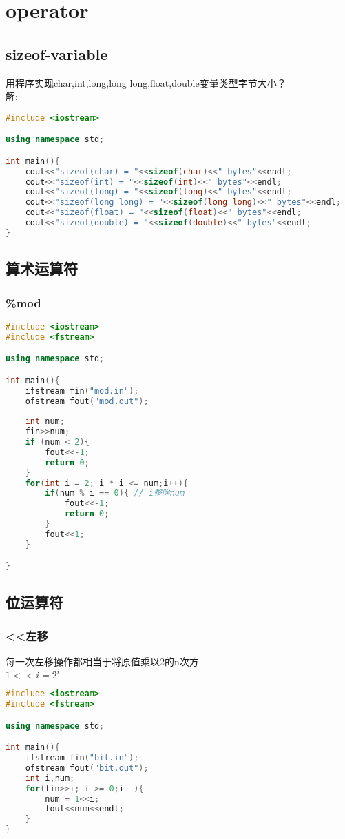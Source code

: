 \documentclass[12pt,twiside,a4paper]{ctexbook}
\numberwithin{chapter}{part}
\begin{document}
\chapter{operator}
\section{sizeof-variable}
用程序实现char,int,long,long long,float,double变量类型字节大小？\\
解:
\begin{lstlisting}[language=C++]
#include <iostream>

using namespace std;

int main(){
	cout<<"sizeof(char) = "<<sizeof(char)<<" bytes"<<endl;
	cout<<"sizeof(int) = "<<sizeof(int)<<" bytes"<<endl;
	cout<<"sizeof(long) = "<<sizeof(long)<<" bytes"<<endl;
	cout<<"sizeof(long long) = "<<sizeof(long long)<<" bytes"<<endl;
	cout<<"sizeof(float) = "<<sizeof(float)<<" bytes"<<endl;
	cout<<"sizeof(double) = "<<sizeof(double)<<" bytes"<<endl;
}
\end{lstlisting}
\section{算术运算符}
\subsection{\%mod}
\begin{lstlisting}[language=C++]
#include <iostream>
#include <fstream>

using namespace std;

int main(){
	ifstream fin("mod.in");
	ofstream fout("mod.out");
	
	int num;
	fin>>num;
	if (num < 2){
		fout<<-1;
		return 0;
	}
	for(int i = 2; i * i <= num;i++){
		if(num % i == 0){ // i整除num
			fout<<-1;
			return 0; 
		}
		fout<<1;
	}

}
\end{lstlisting}

\section{位运算符}
\subsection{<<左移}
每一次左移操作都相当于将原值乘以2的n次方\\
$1<<i = 2^i$
\begin{lstlisting}[language=C++]
#include <iostream>
#include <fstream>

using namespace std;

int main(){
	ifstream fin("bit.in");
	ofstream fout("bit.out");
	int i,num;
	for(fin>>i; i >= 0;i--){
		num = 1<<i; 
		fout<<num<<endl;
	}
}
\end{lstlisting}
\end{document}
